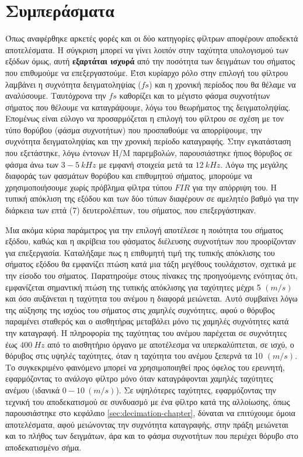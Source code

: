 \documentclass[breaklines=true, 12pt]{article}
\begin{document}
{{{\section{Συμπεράσματα}
\label{sec:org3f5704a}
Όπως αναφέρθηκε αρκετές φορές και οι δύο κατηγορίες φίλτρων αποφέρουν αποδεκτά
αποτελέσματα. Η σύγκριση μπορεί να γίνει λοιπόν στην ταχύτητα
υπολογισμού των εξόδων όμως, αυτή \textbf{εξαρτάται ισχυρά} από την ποσότητα των
δειγμάτων του σήματος που επιθυμούμε να επεξεργαστούμε. Έτσι κυρίαρχο
ρόλο στην επιλογή του φίλτρου λαμβάνει η συχνότητα δειγματοληψίας (\(fs\)) και η
χρονική περίοδος που θα θέλαμε να αναλύσουμε. Ταυτόχρονα την \(fs\) καθορίζει
και το μέγιστο φάσμα συχνοτήτων σήματος που θέλουμε να καταγράψουμε, λόγω του
θεωρήματος της δειγματοληψίας. Επομένως είναι εύλογο να προσαρμόζεται η
επιλογή του φίλτρου σε σχέση με τον τύπο θορύβου (φάσμα συχνοτήτων)
που προσπαθούμε να απορρίψουμε, την συχνότητα δειγματοληψίας και την χρονική
περίοδο καταγραφής. Στην εγκατάσταση που εξετάστηκε, λόγω έντονων Η/Μ
παρεμβολών, παρουσιάστηκε ήπιος θόρυβος σε φάσμα άνω των \(3-5\ kHz\) με εμφανή
στοιχεία μετά τα \(12\ kHz\). Λόγω της μεγάλης διαφοράς των φασμάτων θορύβου και
επιθυμητού σήματος, μπορούμε να χρησιμοποιήσουμε χωρίς πρόβλημα φίλτρα τύπου
\(FIR\) για την απόρριψη του. Η τυπική απόκλιση της εξόδου και των δύο τύπων
διαφέρουν σε αμελητέο βαθμό για την διάρκεια των επτά (7) δευτερολέπτων, του
σήματος, που επεξεργάστηκαν.

Μια ακόμα κύρια παράμετρος για την επιλογή αποτέλεσε η ποιότητα του σήματος
εξόδου, καθώς και η ακρίβεια του φάσματος διέλευσης συχνοτήτων που
προορίζονταν για επεξεργασία. Καταλήξαμε πως η επιθυμητή τιμή της τυπικής
απόκλισης του σήματος εξόδου θα εμφανίζει πτώση κατά μια τάξη μεγέθους
τουλάχιστον, σχετικά με την είσοδο του σήματος. Παρατηρούμε στους πίνακες της
προηγούμενης ενότητας ότι, εμφανίζεται σημαντική πτώση της τυπικής απόκλισης
για ταχύτητες μέχρι 5 \((m/s)\) και όσο αυξάνεται η ταχύτητα του ανέμου η διαφορά
μειώνεται. Αυτό συμβαίνει λόγω της αύξησης της ισχύος του σήματος στις χαμηλές
συχνότητες, αφού ο θόρυβος παραμένει σταθερός και ο αισθητήρας μεταβάλει μόνο
τις χαμηλές συχνότητες κατά την καταγραφή. Η πληροφορία της
ταχύτητας του ανέμου παρέχεται σε συχνότητες έως \(400\ Hz\) από το αισθητήριο όργανο
με αποτέλεσμα να υπερκαλύπτεται, σε ισχύ, ο θόρυβος στις υψηλές ταχύτητες, όταν η
ταχύτητα του ανέμου ξεπερνά τα 10 \((m/s)\). Το συγκεκριμένο φαινόμενο μπορεί να
χρησιμοποιηθεί προς όφελος του ερευνητή, εφαρμόζοντας το ανάλογο φίλτρο μόνο
όταν καταγράφονται χαμηλές ταχύτητες ανέμου (ιδανικά \(0-10\
(m/s)\)).
Σε υψηλότερες ταχύτητες, εφαρμόζοντας την τεχνική του αποδεκατισμού σε συνδυασμό
με ένα φίλτρο κατά της αλλοίωσης, όπως παρουσιάστηκε στο κεφάλαιο
\ref{sec:decimation-chapter}, δύναται να επιτύχουμε όμοια αποτελέσματα, αφού
μειώνοντας την συχνότητα καταγραφής, στην πράξη μειώνεται και το πλήθος των
δειγμάτων, άρα και το φάσμα συχνοτήτων που περιέχει θόρυβο στο αποδεκατισμένο σήμα.

}}}
\end{document}
